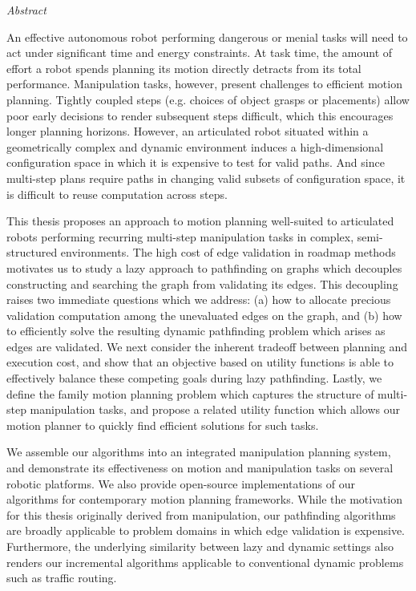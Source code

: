 
\begin{fullwidth}
\begin{adjustwidth}{1in}{1in}

{\LARGE \emph{Abstract}}

\vspace{0.2in}

An effective autonomous robot performing dangerous or menial tasks
will need to act under significant time and energy constraints.
At task time,
the amount of effort a robot spends planning its motion directly
detracts from its total performance.
Manipulation tasks, however, present challenges
to efficient motion planning.
Tightly coupled steps (e.g. choices of object grasps or placements)
allow poor early decisions to render subsequent steps difficult,
which this encourages longer planning horizons.
However,
an articulated robot
situated within a geometrically complex and dynamic environment
induces a high-dimensional configuration space
in which it is expensive to test for valid paths.
And since multi-step plans
require paths in changing valid subsets of configuration space,
it is difficult to reuse computation across steps.

\vspace{0.2cm}

This thesis proposes an approach to motion planning
well-suited to articulated robots
performing recurring multi-step manipulation tasks
in complex, semi-structured environments.
The high cost of edge validation in roadmap methods
motivates us to study a lazy approach to pathfinding on graphs
which decouples constructing and searching the graph
from validating its edges.
This decoupling raises two immediate questions which we address:
(a) how to allocate precious validation computation
among the unevaluated edges on the graph,
and (b) how to efficiently solve the resulting dynamic pathfinding
problem which arises as edges are validated.
We next consider the inherent tradeoff
between planning and execution cost,
and show that an objective based on utility functions
is able to effectively balance these competing goals
during lazy pathfinding.
Lastly,
we define the family motion planning problem
which captures the structure of multi-step manipulation tasks,
and propose a related utility function which allows our
motion planner to quickly find efficient solutions for such tasks.

\vspace{0.2cm}

We assemble our algorithms into an integrated manipulation planning
system,
and demonstrate its effectiveness on motion and manipulation tasks
on several robotic platforms.
We also provide open-source implementations of our algorithms
for contemporary motion planning frameworks.
While the motivation for this thesis originally derived
from manipulation,
our pathfinding algorithms are broadly applicable to problem domains
in which edge validation is expensive.
Furthermore,
the underlying similarity between lazy and dynamic settings
also renders our incremental algorithms applicable
to conventional dynamic problems such as traffic routing.

\end{adjustwidth}
\end{fullwidth}
